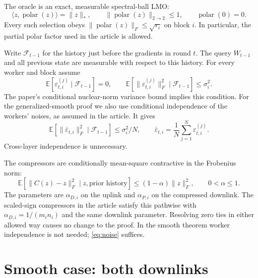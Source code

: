 \documentclass[11pt]{article}
\newcommand{\E}{\mathbb E}
\newcommand{\op}[1]{\lVert #1\rVert_{2\to2}}
\newcommand{\nuc}[1]{\lVert #1\rVert_*}
\newcommand{\frob}[1]{\lVert #1\rVert_F}
\newcommand{\ip}[2]{\langle #1,#2\rangle}
\newcommand{\avg}{\frac1N\sum_{j=1}^N}
\newcommand{\pol}{\operatorname{polar}}
\begin{document}
The oracle is an exact, measurable spectral-ball LMO:
\begin{equation}\label{eq:polar}
 \ip{z}{\pol(z)}=\nuc z,\qquad
 \op{\pol(z)}\le1,\qquad \pol(0)=0.
\end{equation}
Every such selection obeys $\frob{\pol(z)}\le\sqrt{r_i}$ on block $i$.
In particular, the partial polar factor used in the article is allowed.

Write $\mathcal F_{t-1}$ for the history just before the gradients in round
$t$. The query $W_{t-1}$ and all previous state are measurable with respect
to this history. For every worker and block assume
\begin{equation}\label{eq:noise}
 \E[\varepsilon_{t,i}^{(j)}\mid\mathcal F_{t-1}]=0,
 \qquad
 \E[\frob{\varepsilon_{t,i}^{(j)}}^2\mid\mathcal F_{t-1}]
 \le\sigma_i^2.
\end{equation}
The paper's conditional nuclear-norm variance bound implies this condition.
For the generalized-smooth proof we also use conditional independence of
the workers' noises, as assumed in the article. It gives
\begin{equation}\label{eq:mean-noise}
 \E[\frob{\bar\varepsilon_{t,i}}^2\mid\mathcal F_{t-1}]
 \le\sigma_i^2/N,\qquad
 \bar\varepsilon_{t,i}=\avg\varepsilon_{t,i}^{(j)}.
\end{equation}
Cross-layer independence is unnecessary.

The compressors are conditionally mean-square contractive in the
Frobenius norm:
\begin{equation}\label{eq:contraction}
 \E[\frob{C(z)-z}^2\mid z,\text{prior history}]
 \le(1-\alpha)\frob z^2,\qquad 0<\alpha\le1.
\end{equation}
The parameters are $\alpha_{D,i}$ on the uplink and $\alpha_{P,i}$ on
the compressed downlink. The scaled-sign compressors in the article
satisfy this pathwise with $\alpha_{D,i}=1/(m_i n_i)$ and the same
downlink parameter. Resolving zero ties in either allowed way causes no
change to the proof. In the smooth theorem worker independence is not
needed; \eqref{eq:noise} suffices.

\section{Smooth case: both downlinks}
\end{document}
